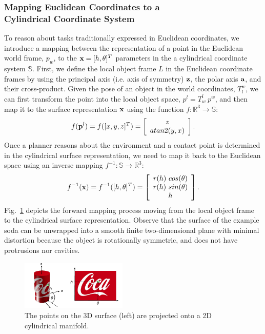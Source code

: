 \documentclass{aamas2015}
\begin{document}
\subsubsection{Mapping Euclidean Coordinates to a \\Cylindrical Coordinate System}

To reason about tasks traditionally expressed in Euclidean coordinates, we introduce a mapping 
between the representation of a point in the Euclidean world frame, $p_w$, to the $\textbf{x} = [h,\theta]^T$
parameters in the a cylindrical coordinate system $\mathbb{S}$. First, we define the local object frame $L$ in the
Euclidean coordinate frames by using the principal axis (i.e. axis of symmetry) $\textbf{z}$, the polar axis $\textbf{a}$, and
their cross-product. Given the pose of an object in the world coordinates, $T^w_l$, we can first
transform the point into the local object space, $p^l = T^l_w ~ p^w$, and then map it to the surface
representation $\textbf{x}$ using the function $f: \mathbb{R}^3 \rightarrow \mathbb{S}$: 
\begin{equation}
  f(\textbf{p}^l) = f([x,y,z]^T) = \left[ \begin{array}{c} z \\ atan2(y,x) \end{array}\right].
\end{equation}
Once a planner reasons about the environment and a contact point is determined in the cylindrical surface representation,
we need to map it back to the Euclidean space using an inverse mapping $f^{-1}: \mathbb{S} \rightarrow \mathbb{R}^3 $:
\begin{equation}
  f^{-1}(\textbf{x}) = f^{-1}([h, \theta]^T) = \left[ 
  \begin{array}{c}
  r(h) ~ cos(\theta) \\ r(h) ~ sin(\theta)\\ h 
  \end{array} \right]. 
\end{equation}
Fig.~\ref{fig:unfolding} depicts the forward mapping process moving from the local object frame to the cylindrical surface representation. Observe that the surface of the example soda can be unwrapped into a smooth finite two-dimensional plane with minimal distortion because the object is rotationally
symmetric, and does not have protrusions nor cavities. 
\begin{figure}[t!]
  \begin{center}
    \includegraphics[width=0.45\textwidth]{./images/unfolding.pdf} \quad
  \end{center}
  \caption{The points on the 3D surface (left) are projected onto a 2D cylindrical manifold.}
  \label{fig:unfolding} 
\end{figure}
\end{document}
